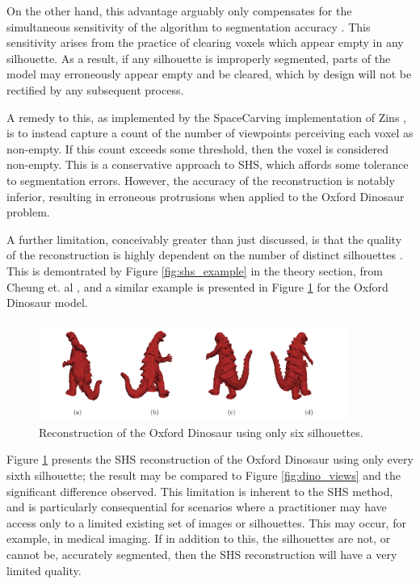 On the other hand, this advantage arguably only compensates for the simultaneous sensitivity of the algorithm to segmentation accuracy \cite{lovell_2023b}. This sensitivity arises from the practice of clearing voxels which appear empty in any silhouette. As a result, if any silhouette is improperly segmented, parts of the model may erroneously appear empty and be cleared, which by design will not be rectified by any subsequent process.

A remedy to this, as implemented by the SpaceCarving implementation of Zins \cite{zins_2019}, is to instead capture a count of the number of viewpoints perceiving each voxel as non-empty. If this count exceeds some threshold, then the voxel is considered non-empty. This is a conservative approach to SHS, which affords some tolerance to segmentation errors. However, the accuracy of the reconstruction is notably inferior, resulting in erroneous protrusions when applied to the Oxford Dinosaur problem.

A further limitation, conceivably greater than just discussed, is that the quality of the reconstruction is highly dependent on the number of distinct silhouettes \cite{cheung_2005}. This is demontrated by Figure \ref{fig:shs_example} in the theory section, from Cheung et. al \cite{cheung_2005}, and a similar example is presented in Figure \ref{fig:bad_reconstruction} for the Oxford Dinosaur model.

\begin{figure}[ht]
  \centering
  \includegraphics[width=0.9\textwidth]{images/q2_bad_reconstruction.png}
  \caption{Reconstruction of the Oxford Dinosaur using only six silhouettes.}
  \label{fig:bad_reconstruction}
\end{figure}

Figure \ref{fig:bad_reconstruction} presents the SHS reconstruction of the Oxford Dinosaur using only every sixth silhouette; the result may be compared to Figure \ref{fig:dino_views} and the significant difference observed. This limitation is inherent to the SHS method, and is particularly consequential for scenarios where a practitioner may have access only to a limited existing set of images or silhouettes. This may occur, for example, in medical imaging. If in addition to this, the silhouettes are not, or cannot be, accurately segmented, then the SHS reconstruction will have a very limited quality.


